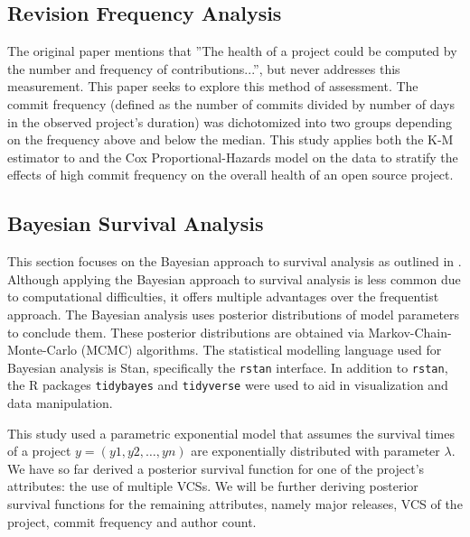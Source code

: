 \documentclass[acmconf]{acmart}
\begin{document}
\subsection{Revision Frequency Analysis}

The original paper mentions that ''The health of a project could be computed by the number and frequency of contributions...'', but never addresses this measurement.
This paper seeks to explore this method of assessment. 
The commit frequency (defined as the number of commits divided by number of days in the observed project's duration) was dichotomized into two groups depending on the frequency above and below the median. 
This study applies both the K-M estimator to and the Cox Proportional-Hazards model on the data to stratify the effects of high commit frequency on the overall health of an open source project.

\subsection{Bayesian Survival Analysis}

This section focuses on the Bayesian approach to survival analysis as outlined in \cite{kelter2020bayesian}. 
Although applying the Bayesian approach to survival analysis is less common due to computational difficulties, it offers multiple advantages over the frequentist approach. 
The Bayesian analysis uses posterior distributions of model parameters to conclude them. 
These posterior distributions are obtained via Markov-Chain-Monte-Carlo (MCMC) algorithms. 
The statistical modelling language used for Bayesian analysis is Stan, specifically the \lstinline!rstan! interface. In addition to \lstinline!rstan!, the R packages \lstinline[language=R]!tidybayes! and \lstinline[language=R]!tidyverse! were used to aid in visualization and data manipulation.

This study used a parametric exponential model that assumes the survival times of a project $y = (y1, y2, \dots , yn)$ are exponentially distributed with parameter $\lambda$.
We have so far derived a posterior survival function for one of the project's attributes: the use of multiple VCSs. 
We will be further deriving posterior survival functions for the remaining attributes, namely major releases, VCS of the project, commit frequency and author count. 
\end{document}
